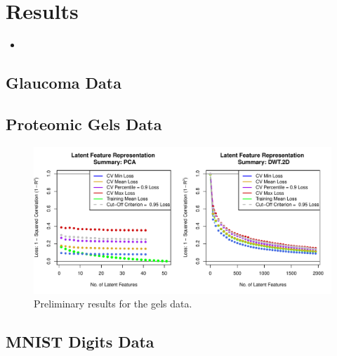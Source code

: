 \section{Results}\label{sec:results}

\begin{itemize}
    \item 
\end{itemize}

\subsection{Glaucoma Data}
\subsection{Proteomic Gels Data}

\begin{figure}
    \centering
    \includegraphics[width=1\linewidth]{figures/initial-gels.pdf}
    \caption{Preliminary results for the gels data.}
    \label{fig:enter-label}
\end{figure}
\subsection{MNIST Digits Data}